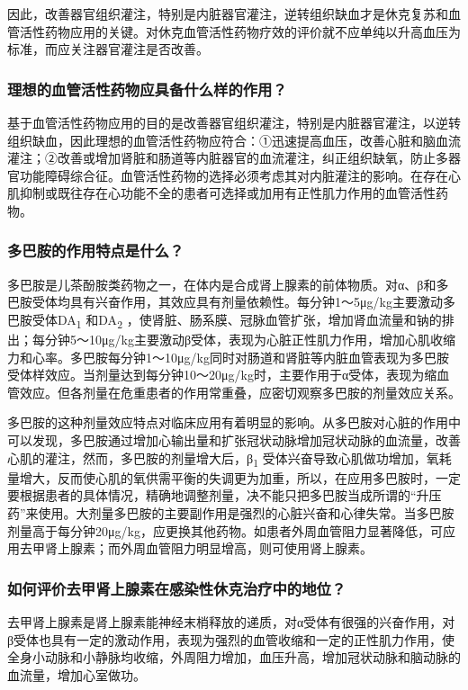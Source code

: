 因此，改善器官组织灌注，特别是内脏器官灌注，逆转组织缺血才是休克复苏和血管活性药物应用的关键。对休克血管活性药物疗效的评价就不应单纯以升高血压为标准，而应关注器官灌注是否改善。

\subsubsection{理想的血管活性药物应具备什么样的作用？}

基于血管活性药物应用的目的是改善器官组织灌注，特别是内脏器官灌注，以逆转组织缺血，因此理想的血管活性药物应符合：①迅速提高血压，改善心脏和脑血流灌注；②改善或增加肾脏和肠道等内脏器官的血流灌注，纠正组织缺氧，防止多器官功能障碍综合征。血管活性药物的选择必须考虑其对内脏灌注的影响。在存在心肌抑制或既往存在心功能不全的患者可选择或加用有正性肌力作用的血管活性药物。

\subsubsection{多巴胺的作用特点是什么？}

多巴胺是儿茶酚胺类药物之一，在体内是合成肾上腺素的前体物质。对α、β和多巴胺受体均具有兴奋作用，其效应具有剂量依赖性。每分钟1～5μg/kg主要激动多巴胺受体DA\textsubscript{1}
和DA\textsubscript{2}
，使肾脏、肠系膜、冠脉血管扩张，增加肾血流量和钠的排出；每分钟5～10μg/kg主要激动β受体，表现为心脏正性肌力作用，增加心肌收缩力和心率。多巴胺每分钟1～10μg/kg同时对肠道和肾脏等内脏血管表现为多巴胺受体样效应。当剂量达到每分钟10～20μg/kg时，主要作用于α受体，表现为缩血管效应。但各剂量在危重患者的作用常重叠，应密切观察多巴胺的剂量效应关系。

多巴胺的这种剂量效应特点对临床应用有着明显的影响。从多巴胺对心脏的作用中可以发现，多巴胺通过增加心输出量和扩张冠状动脉增加冠状动脉的血流量，改善心肌的灌注，然而，多巴胺的剂量增大后，β\textsubscript{1}
受体兴奋导致心肌做功增加，氧耗量增大，反而使心肌的氧供需平衡的失调更为加重，所以，在应用多巴胺时，一定要根据患者的具体情况，精确地调整剂量，决不能只把多巴胺当成所谓的“升压药”来使用。大剂量多巴胺的主要副作用是强烈的心脏兴奋和心律失常。当多巴胺剂量高于每分钟20μg/kg，应更换其他药物。如患者外周血管阻力显著降低，可应用去甲肾上腺素；而外周血管阻力明显增高，则可使用肾上腺素。

\subsubsection{如何评价去甲肾上腺素在感染性休克治疗中的地位？}

去甲肾上腺素是肾上腺素能神经末梢释放的递质，对α受体有很强的兴奋作用，对β受体也具有一定的激动作用，表现为强烈的血管收缩和一定的正性肌力作用，使全身小动脉和小静脉均收缩，外周阻力增加，血压升高，增加冠状动脉和脑动脉的血流量，增加心室做功。

